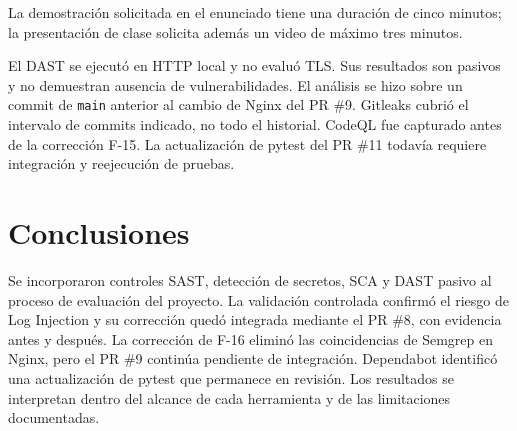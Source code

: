\documentclass[journal]{IEEEtran}
\begin{document}
La demostración solicitada en el enunciado tiene una duración de cinco minutos; la presentación de clase solicita además un video de máximo tres minutos.

El DAST se ejecutó en HTTP local y no evaluó TLS. Sus resultados son pasivos y no demuestran ausencia de vulnerabilidades. El análisis se hizo sobre un commit de \texttt{main} anterior al cambio de Nginx del PR \#9. Gitleaks cubrió el intervalo de commits indicado, no todo el historial. CodeQL fue capturado antes de la corrección F-15. La actualización de pytest del PR \#11 todavía requiere integración y reejecución de pruebas.

\section{Conclusiones}
Se incorporaron controles SAST, detección de secretos, SCA y DAST pasivo al proceso de evaluación del proyecto. La validación controlada confirmó el riesgo de Log Injection y su corrección quedó integrada mediante el PR \#8, con evidencia antes y después. La corrección de F-16 eliminó las coincidencias de Semgrep en Nginx, pero el PR \#9 continúa pendiente de integración. Dependabot identificó una actualización de pytest que permanece en revisión. Los resultados se interpretan dentro del alcance de cada herramienta y de las limitaciones documentadas.
\end{document}
